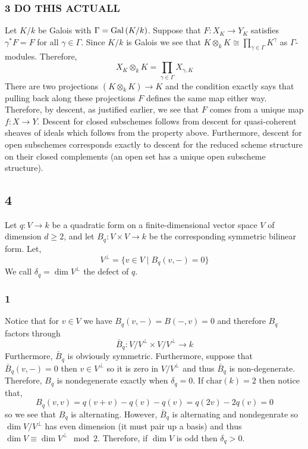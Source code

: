 \documentclass[12pt]{article}
\begin{document}
\subsubsection{3 DO THIS ACTUALL}

Let $K / k$ be Galois with $\Gamma = \mathrm{Gal}\left( K/k \right)$. Suppose that $F : X_K \to Y_K$ satisfies $\gamma^* F = F$ for all $\gamma \in \Gamma$. Since $K / k$ is Galois we see that $K \otimes_k K \cong \prod_{\gamma \in \Gamma} K^\gamma$ as $\Gamma$-modules. Therefore,
\[ X_K \otimes_k K = \prod_{\gamma \in \Gamma} X_{\gamma, K} \]
There are two projections $(K \otimes_k K) \to K$ and the condition exactly says that pulling back along these projections $F$ defines the same map either way. Therefore, by descent, as justified earlier, we see that $F$ comes from a unique map $f : X \to Y$. Descent for closed subschemes follows from descent for quasi-coherent sheaves of ideals which follows from the property above. Furthermore, descent for open subschemes corresponds exactly to descent for the reduced scheme structure on their closed complements (an open set has a unique open subscheme structure). 

\subsection{4}

Let $q : V \to k$ be a quadratic form on a finite-dimensional vector space $V$ of dimension $d \ge 2$, and let $B_q : V \times V \to k$ be the corresponding symmetric bilinear form. Let,
\[ V^\perp = \{ v \in V \mid B_q(v,-) = 0 \} \]
We call $\delta_q = \dim{V^\perp}$ the defect of $q$.

\subsubsection{1}

Notice that for $v \in V$ we have $B_q(v, -) = B(-,v) = 0$ and therefore $B_q$ factors through
\[ \bar{B}_q : V / V^\perp \times V / V^\perp \to k \]
Furthermore, $\bar{B}_q$ is obviously symmetric. Furthermore, suppose that $\bar{B}_q(v, -) = 0$ then $v \in V^\perp$ so it is zero in $V/V^\perp$ and thus $\bar{B}_q$ is non-degenerate. Therefore, $B_q$ is nondegenerate exactly when $\delta_q = 0$. If $\mathrm{char}(k) = 2$ then notice that,
\[ B_q(v,v) = q(v + v) - q(v) - q(v) = q(2v) - 2q(v) = 0 \]
so we see that $B_q$ is alternating. However, $\bar{B}_q$ is alternating and nondegenrate so $\dim{V/V^\perp}$ has even dimension (it must pair up a basis) and thus $\dim{V} \equiv \dim{V^\perp} \mod 2$. Therefore, if $\dim{V}$ is odd then $\delta_q > 0$. 
\end{document}
